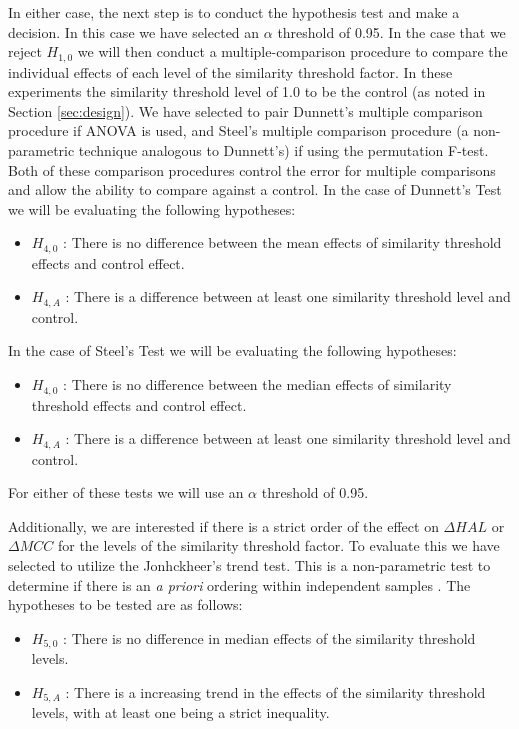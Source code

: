 \documentclass[10pt,nocc]{xrese_report}
\begin{document}
In either case, the next step is to conduct the hypothesis test and make a decision. In this case we have selected an $\alpha$ threshold of 0.95. In the case that we reject $H_{1,0}$ we will then conduct a multiple-comparison procedure to compare the individual effects of each level of the similarity threshold factor. In these experiments the similarity threshold level of 1.0 to be the control (as noted in Section \ref{sec:design}). We have selected to pair Dunnett's \cite{dunnett_multiple_1955} multiple comparison procedure if ANOVA is used, and Steel's \cite{steel_multiple_1959} multiple comparison procedure (a non-parametric technique analogous to Dunnett's) if using the permutation F-test. Both of these comparison procedures control the error for multiple comparisons and allow the ability to compare against a control. In the case of Dunnett's Test we will be evaluating the following hypotheses:

\begin{itemize}
\item $H_{4,0}$ : There is no difference between the mean effects of similarity threshold effects and control effect.
\item $H_{4,A}$ : There is a difference between at least one similarity threshold level and control.
\end{itemize}

\noindent In the case of Steel's Test we will be evaluating the following hypotheses:

\begin{itemize}
\item $H_{4,0}$ : There is no difference between the median effects of similarity threshold effects and control effect.
\item $H_{4,A}$ : There is a difference between at least one similarity threshold level and control.
\end{itemize}

\noindent For either of these tests we will use an $\alpha$ threshold of 0.95.

Additionally, we are interested if there is a strict order of the effect on $\Delta HAL$ or $\Delta MCC$ for the levels of the similarity threshold factor. To evaluate this we have selected to utilize the Jonhckheer's trend test. This is a non-parametric test to determine if there is an \textit{a priori} ordering within independent samples \cite{jonckheere_distribution-free_1954}. The hypotheses to be tested are as follows:

\begin{itemize}
\item $H_{5,0}$ : There is no difference in median effects of the similarity threshold levels.
\item $H_{5,A}$ : There is a increasing trend in the effects of the similarity threshold levels, with at least one being a strict inequality.
\end{itemize}
\end{document}
